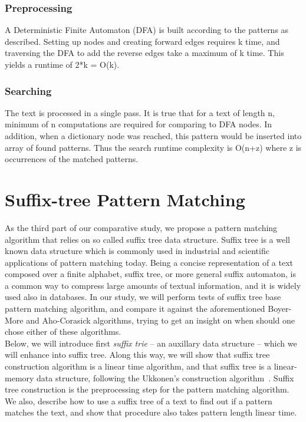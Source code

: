 \documentclass[paper=a4, fontsize=11pt]{scrartcl} %
\numberwithin{equation}{section} %
\numberwithin{figure}{section} %
\numberwithin{table}{section} %
\begin{document}
\subsubsection{Preprocessing}

A Deterministic Finite Automaton (DFA) is built according to the patterns as described. Setting up nodes and creating forward edges requires k time, and traversing the DFA to add the reverse edges take a maximum of k time. This yields a runtime of 2*k = O(k). 

\subsubsection{Searching}

The text is processed in a single pass. It is true that for a text of length n, minimum of n computations are required for comparing to DFA nodes. In addition, when a dictionary node was reached, this pattern would be inserted into array of found patterns. Thus the search runtime complexity is O(n+z) where z is occurrences of the matched patterns. 


\newpage
\section{Suffix-tree Pattern Matching}
As the third part of our comparative study, we propose a pattern matching algorithm that relies on so called suffix tree data structure. Suffix tree is a well known data structure which is commonly used in industrial and scientific applications of pattern matching today. Being a concise representation of a text composed over a finite alphabet, suffix tree, or more general suffix automaton, is a common way to compress large amounts of textual information, and it is widely used also in databases. In our study, we will perform tests of suffix tree base pattern matching algorithm, and compare it against the aforementioned Boyer-More and Aho-Corasick algorithms, trying to get an insight on when should one chose either of these algorithms.\\

Below, we will introduce first \textit{suffix trie} -- an auxillary data structure -- which we will enhance into suffix tree. Along this way, we will show that suffix tree construction algorithm is a linear time algorithm, and that suffix tree is a linear-memory data structure, following the Ukkonen's construction algorithm~\cite{ukkonen1995online}. Suffix tree construction is the preprocessing step for the pattern matching algorithm. We also, describe how to use a suffix tree of a text to find out if a pattern matches the text, and show that procedure also takes pattern length linear time.
\end{document}
